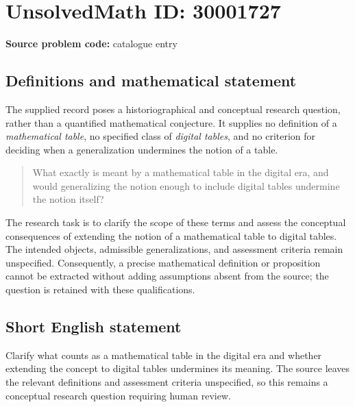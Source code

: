\documentclass[11pt]{article}
\begin{document}
\section*{UnsolvedMath ID: 30001727}
\textbf{Source problem code:} catalogue entry
\subsection{Definitions and mathematical statement}
The supplied record poses a historiographical and conceptual research question, rather than a quantified mathematical conjecture. It supplies no definition of a \emph{mathematical table}, no specified class of \emph{digital tables}, and no criterion for deciding when a generalization undermines the notion of a table.

\begin{quote}
What exactly is meant by a mathematical table in the digital era, and would generalizing the notion enough to include digital tables undermine the notion itself?
\end{quote}

The research task is to clarify the scope of these terms and assess the conceptual consequences of extending the notion of a mathematical table to digital tables. The intended objects, admissible generalizations, and assessment criteria remain unspecified. Consequently, a precise mathematical definition or proposition cannot be extracted without adding assumptions absent from the source; the question is retained with these qualifications.
\subsection{Short English statement}
Clarify what counts as a mathematical table in the digital era and whether extending the concept to digital tables undermines its meaning. The source leaves the relevant definitions and assessment criteria unspecified, so this remains a conceptual research question requiring human review.
\end{document}

